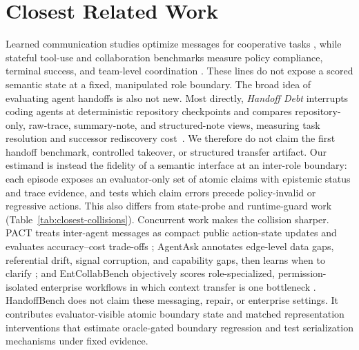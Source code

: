 \section{Closest Related Work}

Learned communication studies optimize messages for cooperative tasks
\citep{sukhbaatar2016commnet,foerster2016dial}, while stateful tool-use and
collaboration benchmarks measure policy compliance, terminal success, and
team-level coordination
\citep{yao2024taubench,lu2025toolsandbox,zhu2025multiagentbench}. These lines do
not expose a scored semantic state at a fixed, manipulated role boundary. The
broad idea of evaluating agent handoffs is also not new. Most directly,
\emph{Handoff Debt} interrupts coding agents at deterministic repository
checkpoints and compares repository-only, raw-trace, summary-note, and
structured-note views, measuring task resolution and successor rediscovery
cost~\citep{kc2026handoff}. We therefore do not claim the first handoff
benchmark, controlled takeover, or structured transfer artifact. Our estimand
is instead the fidelity of a semantic interface at an inter-role boundary: each
episode exposes an evaluator-only set of atomic claims with epistemic status and
trace evidence, and tests which claim errors precede policy-invalid or
regressive actions. This also differs from state-probe and runtime-guard work
\citep{jia2026neurostate,she2026provenanceguard}
(Table~\ref{tab:closest-collisions}).
Concurrent work makes the collision sharper. PACT treats inter-agent messages
as compact public action-state updates and evaluates accuracy--cost trade-offs
\citep{huang2026pact}; AgentAsk annotates edge-level data gaps, referential
drift, signal corruption, and capability gaps, then learns when to clarify
\citep{lin2026agentask}; and EntCollabBench objectively scores role-specialized,
permission-isolated enterprise workflows in which context transfer is one
bottleneck \citep{yu2026entcollab}. HandoffBench does not claim these messaging,
repair, or enterprise settings. It contributes evaluator-visible atomic boundary
state and matched representation interventions that estimate oracle-gated
boundary regression and test serialization mechanisms under fixed evidence.

